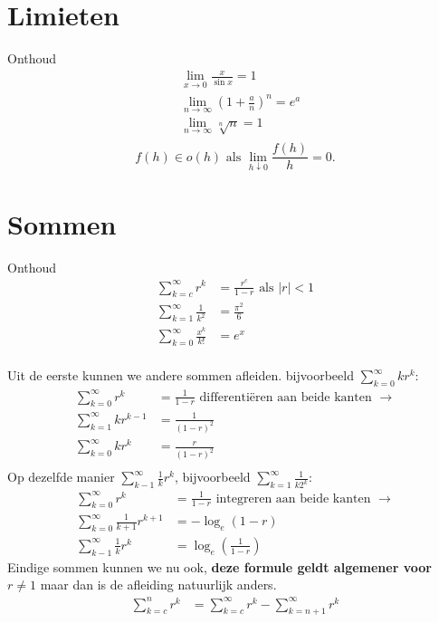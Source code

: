 \documentclass{article}
\begin{document}
    \tableofcontents
    \newpage

    \section{Limieten}\label{sec:limieten}
    Onthoud
    \begin{align*}
        &\lim_{x\to 0} \frac{x}{\sin x} = 1 \\
        &\lim_{n \to \infty} \left( 1 + \frac a n \right)^n = e^a \\
        &\lim_{n \to \infty} \sqrt[n]{n} = 1 \\
    \end{align*}
    \[
        f(h) \in o(h) \text{ als } \lim_{h \downarrow 0} \frac{f(h)}{h} = 0.
    \]
    \section{Sommen}\label{sec:sommen}
    Onthoud
    \begin{align*}
        \sum_{k=c}^{\infty} r^k &= \frac{r^c}{1-r} \text{ als $|r|<1$}\\
        \sum_{k=1}^{\infty} \frac{1}{k^2} &= \frac{\pi^2}{6} \\
        \sum_{k=0}^\infty \frac{x^k}{k!} &= e^x \\
    \end{align*}

    Uit de eerste kunnen we andere sommen afleiden.
    bijvoorbeeld
    $\displaystyle \sum_{k=0}^{\infty} kr^k: $
    \begin{align*}
        \sum_{k=0}^{\infty} r^k &= \frac{1}{1-r} \text { differenti\"eren aan beide kanten } \to \\
        \sum_{k=1}^{\infty} kr^{k-1} &= \frac{1}{(1-r)^2} \\
        \sum_{k=0}^{\infty} kr^k &= \frac{r}{(1-r)^2} \\
    \end{align*}
    Op dezelfde manier $\displaystyle \sum_{k-1}^\infty \frac{1}{k} r^k$, bijvoorbeeld $\displaystyle \sum_{k=1}^{\infty} \frac{1}{k2^k}$:
    \begin{align*}
        \sum_{k=0}^{\infty} r^k &= \frac{1}{1-r} \text { integreren aan beide kanten } \to \\
        \sum_{k=0}^{\infty} \frac{1}{k+1} r^{k+1} &= -\log_e (1-r) \\
        \sum_{k-1}^\infty \frac{1}{k} r^k &= \log_e (\frac{1}{1-r})
    \end{align*}
    Eindige sommen kunnen we nu ook, \textbf{deze formule geldt algemener voor $r\neq 1$} maar dan is de afleiding natuurlijk anders.
    \begin{align*}
        \sum_{k=c}^n r^k &= \sum_{k=c}^\infty r^k - \sum_{k=n+1}^\infty r^k
    \end{align*}
\end{document}
